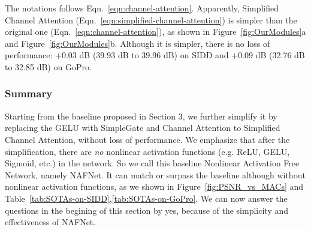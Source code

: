 \documentclass[runningheads]{llncs}
\begin{document}
The notations follows Eqn.~\ref{eqn:channel-attention}. Apparently, Simplified Channel Attention (Eqn.~\ref{eqn:simplified-channel-attention}) is simpler than the original one (Eqn.~\ref{eqn:channel-attention}), as shown in Figure~\ref{fig:OurModules}a and Figure~\ref{fig:OurModules}b.  
Although it is simpler, there is no loss of performance: +0.03 dB (39.93 dB to 39.96 dB) on SIDD and +0.09 dB  (32.76 dB to 32.85 dB) on GoPro. 

\subsubsection{Summary}
Starting from the baseline proposed in Section 3, we further simplify it
by replacing the GELU with SimpleGate and Channel Attention to Simplified Channel Attention, without loss of performance.
We emphasize that after the simplification, there are \emph{no} nonlinear activation functions (e.g. ReLU, GELU, Sigmoid, etc.) in the network. So we call this baseline Nonlinear Activation Free Network, namely NAFNet.
It can match or surpass the baseline although without nonlinear activation functions, as we shown in Figure~\ref{fig:PSNR_vs_MACs} and Table~\ref{tab:SOTAs-on-SIDD},\ref{tab:SOTAs-on-GoPro}.
We can now answer the questions in the begining of this section by yes, because of the simplicity and effectiveness of NAFNet. 
\end{document}
